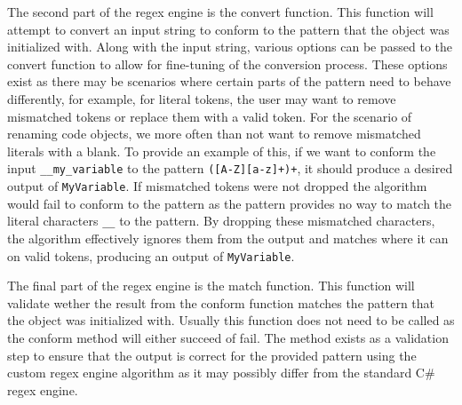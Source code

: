 The second part of the regex engine is the convert function. This function will attempt to convert an input string to conform to the pattern that the object was initialized with.
Along with the input string, various options can be passed to the convert function to allow for fine-tuning of the conversion process. These options exist as there may be scenarios where certain parts of the pattern need to behave differently, for example, for literal tokens, the user may want to remove mismatched tokens or replace them with a valid token.
For the scenario of renaming code objects, we more often than not want to remove mismatched literals with a blank. To provide an example of this, if we want to conform the input \texttt{\_\_my\_variable} to the pattern \texttt{([A-Z][a-z]+)+}, it should produce a desired output of \texttt{MyVariable}. If mismatched tokens were not dropped the algorithm would fail to conform to the pattern as the pattern provides no way to match the literal characters \texttt{\_\_} to the pattern. By dropping these mismatched characters, the algorithm effectively ignores them from the output and matches where it can on valid tokens, producing an output of \texttt{MyVariable}.

The final part of the regex engine is the match function. This function will validate wether the result from the conform function matches the pattern that the object was initialized with. Usually this function does not need to be called as the conform method will either succeed of fail. The method exists as a validation step to ensure that the output is correct for the provided pattern using the custom regex engine algorithm as it may possibly differ from the standard C\# regex engine.
